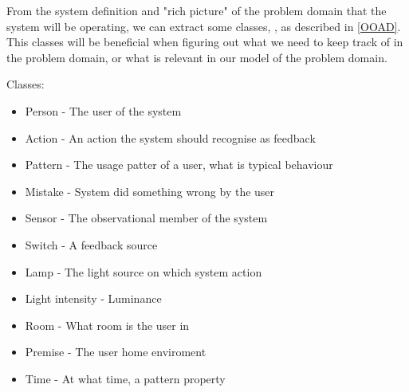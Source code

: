 From the system definition and "rich picture" of the problem domain that the system will be operating, we can extract some classes, , as described in \cref{OOAD}. This classes will be beneficial when figuring out what we need to keep track of in the problem domain, or what is relevant in our model of the problem domain.

Classes:
\begin{itemize}
\item Person - The user of the system
\item Action - An action the system should recognise as feedback
\item Pattern - The usage patter of a user, what is typical behaviour
\item Mistake - System did something wrong by the user
\item Sensor - The observational member of the system
\item Switch - A feedback source
\item Lamp - The light source on which system action
\item Light intensity - Luminance
\item Room - What room is the user in
\item Premise - The user home enviroment
\item Time - At what time, a pattern property
\end{itemize}
